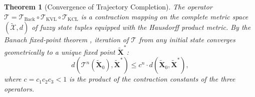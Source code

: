\documentclass[twocolumn,10pt]{article}
\newtheorem{theorem}{Theorem}[section]
\theoremstyle{remark}
\newcommand{\fuzzy}[1]{\tilde{#1}}
\newcommand{\Tkcl}{\mathcal{T}_{\mathrm{KCL}}}
\newcommand{\Tkvl}{\mathcal{T}_{\mathrm{KVL}}}
\newcommand{\Tback}{\mathcal{T}_{\mathrm{Back}}}
\newcommand{\Tcomp}{\mathcal{T}}
\begin{document}
\begin{theorem}[Convergence of Trajectory Completion]
\label{thm:convergence}
The operator $\Tcomp = \Tback \circ \Tkvl \circ \Tkcl$ is a contraction mapping on the complete metric space $(\tilde{\mathcal{X}}, d)$ of fuzzy state tuples equipped with the Hausdorff product metric.  By the Banach fixed-point theorem \cite{banach1922}, iteration of $\Tcomp$ from any initial state converges geometrically to a unique fixed point $\fuzzy{\mathbf{X}}^*$:
\begin{equation}
    d(\Tcomp^n(\fuzzy{\mathbf{X}}_0), \fuzzy{\mathbf{X}}^*) \leq c^n \cdot d(\fuzzy{\mathbf{X}}_0, \fuzzy{\mathbf{X}}^*),
    \label{eq:convergence}
\end{equation}
where $c = c_1 c_2 c_3 < 1$ is the product of the contraction constants of the three operators.
\end{theorem}
\end{document}
